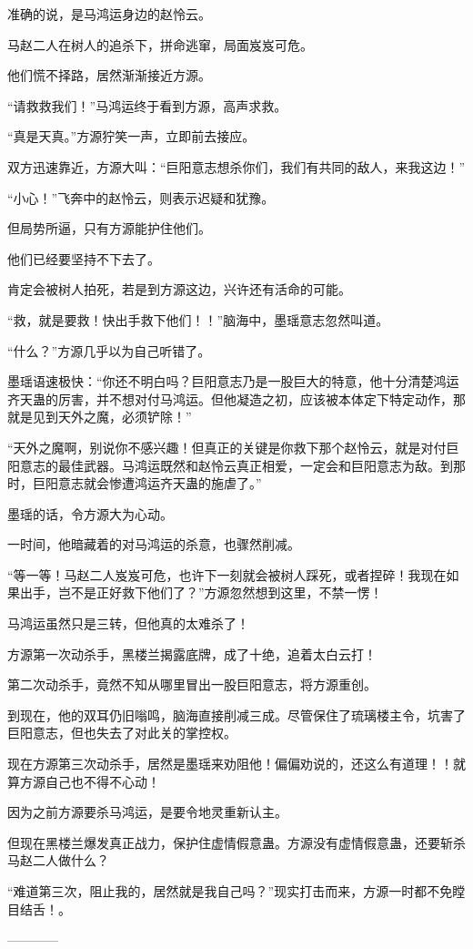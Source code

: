 \begin{this_body}
准确的说，是马鸿运身边的赵怜云。

马赵二人在树人的追杀下，拼命逃窜，局面岌岌可危。

他们慌不择路，居然渐渐接近方源。

“请救救我们！”马鸿运终于看到方源，高声求救。

“真是天真。”方源狞笑一声，立即前去接应。

双方迅速靠近，方源大叫：“巨阳意志想杀你们，我们有共同的敌人，来我这边！”

“小心！”飞奔中的赵怜云，则表示迟疑和犹豫。

但局势所逼，只有方源能护住他们。

他们已经要坚持不下去了。

肯定会被树人拍死，若是到方源这边，兴许还有活命的可能。

“救，就是要救！快出手救下他们！！”脑海中，墨瑶意志忽然叫道。

“什么？”方源几乎以为自己听错了。

墨瑶语速极快：“你还不明白吗？巨阳意志乃是一股巨大的特意，他十分清楚鸿运齐天蛊的厉害，并不想对付马鸿运。但他凝造之初，应该被本体定下特定动作，那就是见到天外之魔，必须铲除！”

“天外之魔啊，别说你不感兴趣！但真正的关键是你救下那个赵怜云，就是对付巨阳意志的最佳武器。马鸿运既然和赵怜云真正相爱，一定会和巨阳意志为敌。到那时，巨阳意志就会惨遭鸿运齐天蛊的施虐了。”

墨瑶的话，令方源大为心动。

一时间，他暗藏着的对马鸿运的杀意，也骤然削减。

“等一等！马赵二人岌岌可危，也许下一刻就会被树人踩死，或者捏碎！我现在如果出手，岂不是正好救下他们了？”方源忽然想到这里，不禁一愣！

马鸿运虽然只是三转，但他真的太难杀了！

方源第一次动杀手，黑楼兰揭露底牌，成了十绝，追着太白云打！

第二次动杀手，竟然不知从哪里冒出一股巨阳意志，将方源重创。

到现在，他的双耳仍旧嗡鸣，脑海直接削减三成。尽管保住了琉璃楼主令，坑害了巨阳意志，但也失去了对此关的掌控权。

现在方源第三次动杀手，居然是墨瑶来劝阻他！偏偏劝说的，还这么有道理！！就算方源自己也不得不心动！

因为之前方源要杀马鸿运，是要令地灵重新认主。

但现在黑楼兰爆发真正战力，保护住虚情假意蛊。方源没有虚情假意蛊，还要斩杀马赵二人做什么？

“难道第三次，阻止我的，居然就是我自己吗？”现实打击而来，方源一时都不免瞠目结舌！。

------------

\end{this_body}

